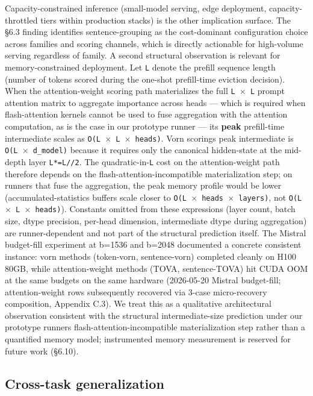 \documentclass[10pt]{article}
\begin{document}
Capacity-constrained inference (small-model serving, edge deployment,
capacity-throttled tiers within production stacks) is the other
implication surface. The \S{}6.3 finding identifies sentence-grouping as
the cost-dominant configuration choice across families and scoring
channels, which is directly actionable for high-volume serving
regardless of family. A second structural observation is relevant for
memory-constrained deployment. Let \texttt{L} denote the prefill
sequence length (number of tokens scored during the one-shot
prefill-time eviction decision). When the attention-weight scoring path
materializes the full \texttt{L\ $\times$\ L} prompt attention matrix to
aggregate importance across heads --- which is required when
flash-attention kernels cannot be used to fuse aggregation with the
attention computation, as is the case in our prototype runner --- its
\textbf{peak} prefill-time intermediate scales as
\texttt{O(L\ $\times$\ L\ $\times$\ heads)}. Vorn scoring\textquotesingle s peak intermediate is
\texttt{O(L\ $\times$\ d\_model)} because it requires only the canonical
hidden-state at the mid-depth layer \texttt{L*=L//2}. The
quadratic-in-\texttt{L} cost on the attention-weight path therefore
depends on the flash-attention-incompatible materialization step; on
runners that fuse the aggregation, the peak memory profile would be
lower (accumulated-statistics buffers scale closer to
\texttt{O(L\ $\times$\ heads\ $\times$\ layers)}, not \texttt{O(L\ $\times$\ L\ $\times$\ heads)}).
Constants omitted from these expressions (layer count, batch size, dtype
precision, per-head dimension, intermediate dtype during aggregation)
are runner-dependent and not part of the structural prediction itself.
The Mistral budget-fill experiment at b=1536 and b=2048
documented a concrete consistent instance: vorn methods
(token-vorn, sentence-vorn) completed cleanly on H100 80GB, while
attention-weight methods (TOVA, sentence-TOVA) hit CUDA OOM
at the same budgets on the same hardware (2026-05-20 Mistral
budget-fill; attention-weight rows subsequently recovered via 3-case
micro-recovery composition, Appendix C.3). We
treat this as a qualitative architectural observation consistent with
the structural intermediate-size prediction under our prototype
runner\textquotesingle s flash-attention-incompatible materialization
step rather than a quantified memory model; instrumented memory
measurement is reserved for future work (\S{}6.10).

\subsection{Cross-task generalization}\label{65-cross-task-generalization}
\end{document}
